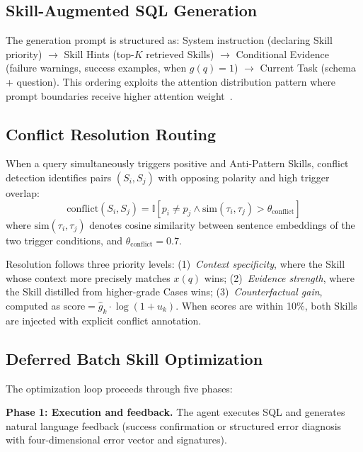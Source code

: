 \subsection{Skill-Augmented SQL Generation}
\label{subsec:generation}

The generation prompt is structured as: System instruction (declaring Skill priority) $\to$ Skill Hints (top-$K$ retrieved Skills) $\to$ Conditional Evidence (failure warnings, success examples, when $g(q)=1$) $\to$ Current Task (schema + question). This ordering exploits the attention distribution pattern where prompt boundaries receive higher attention weight~\cite{liu2024lostmiddle}.

\subsection{Conflict Resolution Routing}
\label{subsec:conflict}

When a query simultaneously triggers positive and Anti-Pattern Skills, conflict detection identifies pairs $(S_i, S_j)$ with opposing polarity and high trigger overlap:
\begin{equation}
  \text{conflict}(S_i, S_j) = \mathbb{I}\!\left[p_i \neq p_j \wedge \text{sim}(\tau_i, \tau_j) > \theta_{\text{conflict}}\right]
\end{equation}
where $\text{sim}(\tau_i, \tau_j)$ denotes cosine similarity between sentence embeddings of the two trigger conditions, and $\theta_{\text{conflict}} = 0.7$.

Resolution follows three priority levels: (1)~\emph{Context specificity}, where the Skill whose context more precisely matches $x(q)$ wins; (2)~\emph{Evidence strength}, where the Skill distilled from higher-grade Cases wins; (3)~\emph{Counterfactual gain}, computed as $\text{score} = \hat{g}_k \cdot \log(1 + u_k)$. When scores are within 10\%, both Skills are injected with explicit conflict annotation.

\subsection{Deferred Batch Skill Optimization}
\label{subsec:optimization}

The optimization loop proceeds through five phases:

\textbf{Phase 1: Execution and feedback.} The agent executes SQL and generates natural language feedback (success confirmation or structured error diagnosis with four-dimensional error vector and signatures).

